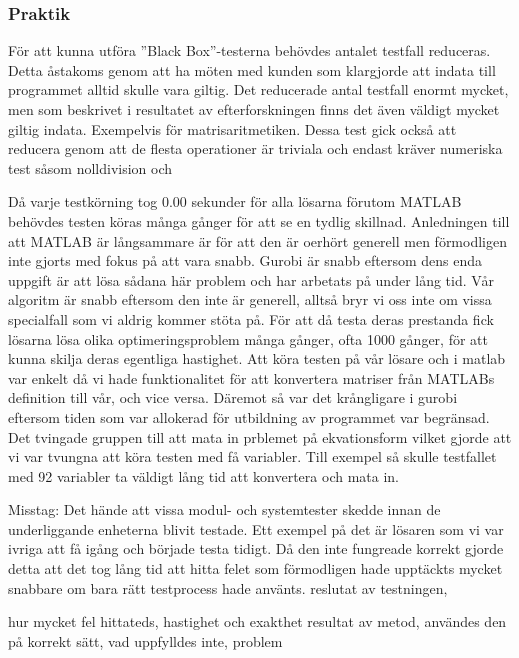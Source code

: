 	\subsubsection{Praktik}
	För att kunna utföra ''Black Box''-testerna behövdes antalet testfall reduceras. Detta åstakoms genom att ha möten med kunden som klargjorde att indata till programmet alltid skulle vara giltig. Det reducerade antal testfall enormt mycket, men som beskrivet i resultatet av efterforskningen finns det även väldigt mycket giltig indata. Exempelvis för matrisaritmetiken. Dessa test gick också att reducera genom att de flesta operationer är triviala och endast kräver numeriska test såsom nolldivision och  
	
	Då varje testkörning tog 0.00 sekunder för alla lösarna förutom MATLAB behövdes testen köras många gånger för att se en tydlig skillnad. Anledningen till att MATLAB är långsammare är för att den är oerhört generell men förmodligen inte gjorts med fokus på att vara snabb. Gurobi är snabb eftersom dens enda uppgift är att lösa sådana här problem och har arbetats på under lång tid. Vår algoritm är snabb eftersom den inte är generell, alltså bryr vi oss inte om vissa specialfall som vi aldrig kommer stöta på. \newline
	För att då testa deras prestanda fick lösarna lösa olika optimeringsproblem många gånger, ofta 1000 gånger, för att kunna skilja deras egentliga hastighet. Att köra testen på vår lösare och i matlab var enkelt då vi hade funktionalitet för att konvertera matriser från MATLABs definition till vår, och vice versa. Däremot så var det krångligare i gurobi eftersom tiden som var allokerad för utbildning av programmet var begränsad. Det tvingade gruppen till att mata in prblemet på ekvationsform vilket gjorde att vi var tvungna att köra testen med få variabler. Till exempel så skulle testfallet med 92 variabler ta väldigt lång tid att konvertera och mata in.
		
	Misstag: Det hände att vissa modul- och systemtester skedde innan de underliggande enheterna blivit testade. Ett exempel på det är lösaren som vi var ivriga att få igång och började testa tidigt. Då den inte fungreade korrekt gjorde detta att det tog lång tid att hitta felet som förmodligen hade upptäckts mycket snabbare om bara rätt testprocess hade använts. 
	reslutat av testningen, \newline
	
	
	hur mycket fel hittateds, \newline
	hastighet och exakthet\newline
	resultat av metod, \newline
	användes den på korrekt sätt, \newline
	vad uppfylldes inte, \newline
	problem\newline
	
